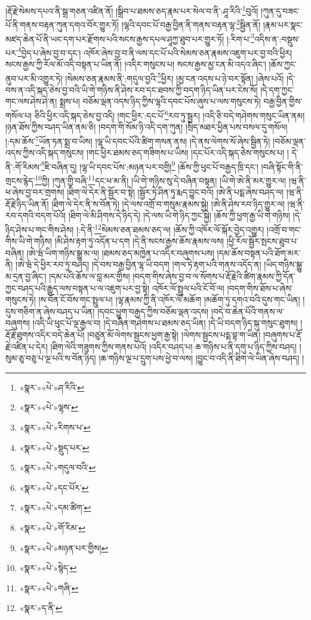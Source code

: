 །རྡོ་རྗེ་སེམས་དཔའ་ནི་སྒྲ་གཅན་འཛིན་ནོ། །སྒྲིབ་པ་ཐམས་ཅད་རྣམ་པར་སེལ་བ་ནི་:ཤཱ་རིའི་\footnote{«སྣར་»«པེ་»ཤ་རིའི་}བུའོ། །ཀུན་དུ་བཟང་པོ་ནི་གནས་བརྟན་ཀུན་དགའ་བོར་གྱུར་ཏོ། །ལྷའི་དབང་པོ་བརྒྱ་བྱིན་ནི་གནས་བརྟན་ལྷ་\footnote{«སྣར་»«པེ་»ལྷས་}སྦྱིན་ནོ། །རྣམ་པར་སྣང་མཛད་ཆེན་པོ་ནི་ཡང་དག་པར་རྫོགས་པའི་སངས་རྒྱས་དཔལ་ཤཱཀྱ་ཐུབ་པར་གྱུར་ཏོ། །:རིག་པ་\footnote{«སྣར་»«པེ་»རིགས་པ་}འདིས་ན་:བསྡུས་པར་\footnote{«སྣར་»«པེ་»སྡུད་པར་}བྱེད་པ་ཞེས་བྱ་བ་དང་། འཁོར་ཞེས་བྱ་བ་ནི་ལས་དང་པོ་པའི་སེམས་ཅན་རྣམས་འཇུག་པར་བྱ་བའི་ཕྱིར། སངས་རྒྱས་ཀྱི་རོལ་མོ་འདི་བསྟན་པ་ཡིན་ནོ། །འདིར་གསུངས་པ། སངས་རྒྱས་མྱ་ངན་མི་འདའ་ཞིང་། །ཆོས་ཀྱང་ནུབ་པར་མི་འགྱུར་ཏེ། །སེམས་ཅན་རྣམས་ནི་:གདུལ་བྱའི་\footnote{«སྣར་»«པེ་»གདུལ་བའི་}ཕྱིར། །མྱ་ངན་འདས་པ་ཉེ་བར་སྟོན། །ཞེས་པའོ། །དེ་བས་ན་འདི་སྐད་ཅེས་བྱ་བའི་ཡི་གེ་གཉིས་ནི་ཤེས་རབ་དང་ཐབས་ཀྱི་བདག་ཉིད་ཡིན་པར་ངེས་སོ། །དེ་དག་ཀྱང་གང་ལས་ཤེས་ཤེ་ན། སྨྲས་པ། བཅོམ་ལྡན་འདས་ཉིད་ཀྱིས་ལྷའི་དབང་པོས་ཞུས་པ་ལས་གསུངས་ཏེ། བརྒྱ་བྱིན་གྱིས་གསོལ་པ། ཅིའི་ཕྱིར་འདི་སྐད་ཅེས་བྱ་འདི། །གང་ཕྱིར་:དང་པོ་\footnote{«སྣར་»«པེ་»དང་པོར་}རབ་ཏུ་སྦྱར། །འདི་ཅི་བདེ་གཤེགས་གསུང་ཡིན་ནམ། །ཉན་ཐོས་ཀྱིས་བཤད་ཡིན་ནམ་ཅི། །བདག་གི་སོམ་ཉི་འདི་དག་ཀུན། །སྲིད་མཐར་ཕྱིན་པས་བསལ་དུ་གསོལ། །:དམ་ཆོས་\footnote{«སྣར་»«པེ་»དམ་ཚིག་}ཡོན་ཏན་སྨྲ་བ་ཡིས། །ལྷ་ཡི་དབང་པོའི་ཚིག་གསན་ནས། །དེ་ནས་ལེགས་སོ་ཞེས་སྦྱིན་ཏེ། །བཅོམ་ལྡན་འདས་ཀྱིས་འདི་སྐད་གསུངས། །གང་ཕྱིར་ཐམས་ཅད་གཟིགས་པ་ཡིས། །དང་པོར་འདི་སྐད་ཅེས་གསུངས་པ། །
དེ་ནི་:གོ་རིམས་\footnote{«སྣར་»«པེ་»གོ་རིམ་}ཇི་བཞིན་དུ། །ལྷ་ཡི་དབང་པོས་:མཉན་པར་བགྱི།\footnote{«སྣར་»«པེ་»མཉན་པར་གྱིས།} །ཆོས་ཀྱི་ཕུང་པོ་བརྒྱད་ཁྲི་དང་། །བཞི་སྟོང་གི་ནི་གྲངས་རྙེད་\footnote{«སྣར་»«པེ་»སྙེད་}ཀྱི། །ཀུན་གྱི་བཞི་\footnote{«སྣར་»«པེ་»གཞི་}དང་ཕ་མ་ནི། །ཡི་གེ་གཉིས་སུ་དེ་བཞིན་བསྟན། །ཡི་གེ་ཨེ་ནི་མར་གྱུར་ལ། །ཝ་ནི་ཕ་ཞེས་བྱ་བར་གྲགས། །ཐིག་ལེ་དེར་ནི་སྦྱོར་བ་སྟེ། །སྦྱོར་ཏེ་ཤིན་ཏུ་རྨད་བྱུང་བའོ། །ཨེ་ནི་པདྨ་ཞེས་བཤད་ལ། །ཝ་ནི་རྡོ་རྗེ་ཉིད་ཡིན་ནོ། །ཐིག་ལེ་དེར་ནི་ས་བོན་ཏེ། །དེ་ལས་འགྲོ་བ་གསུམ་རྣམས་སྐྱེ། །ཨེ་ནི་ཤེས་རབ་ཉིད་གྱུར་ལ། །ཝ་ནི་རབ་དགའི་བདག་པོའོ། །ཐིག་ལེ་མི་ཤིགས་དེ་ཉིད་དེ། །དེ་ལས་ཡི་གེ་ཉིད་ཀྱང་སྐྱེ། །ཆོས་ཀྱི་ཕྱག་རྒྱ་ཡི་གེ་གཉིས། །དེ་ཉིད་ཤེས་པ་གང་གིས་ཤེས། །:དེ་ནི་\footnote{«སྣར་»ད་ནི་}སེམས་ཅན་ཐམས་ཅད་ལ། །ཆོས་ཀྱི་འཁོར་ལོ་སྐོར་བྱེད་འགྱུར། །འགྲོ་བ་གང་གིས་ཡི་གེ་གཉིས། །མི་ཤེས་རྟག་ཏུ་འདོན་པ་དག །དེ་ནི་སངས་རྒྱས་ཆོས་རྣམས་ལས། །ཕྱི་རོལ་སྦྱོར་སྤངས་ཐུབ་པ་བཞིན། །ཨེ་ཝཾ་ཡིག་གཉིས་སྒྱུ་མ་ལ། །ཐམས་ཅད་མཁྱེན་པ་འདིར་བཞུགས་པས། །དམ་ཆོས་བསྟན་པའི་ཐོག་མར་ནི། །ཨེ་ཝཾ་དེ་ཕྱིར་རབ་ཏུ་བཤད། །དེ་བས་བརྒྱ་བྱིན་ལྷ་ཡི་བདག །གལ་ཏེ་རྟག་པའི་གནས་འདོད་ན། །ཡིད་གཉིས་སྒྱུ་མ་དྲན་བྱ་ཞིང་། །དམ་པའི་ཆོས་ལ་བླ་མར་གྱིས། །བདག་གིས་ཞེས་བྱ་བ་ལ་སོགས་པ་རྡོ་རྗེའི་ཚིག་རྣམས་ཀྱི་དོན་ཀྱང་བཤད་པའི་རྒྱུད་ལས་བསྟན་པ་ལ་འཇུག་པར་བྱ་སྟེ། འཁོར་ལོ་སྤྲུལ་པའི་ངོ་བོ་ལ། །བདག་གིས་ཐོས་པ་ཞེས་གསུངས་ཏེ། །ས་བོན་ངོ་བོས་གང་སྤྲུལ་པ། །ལྷ་རྣམས་ཀྱི་ནི་འཁོར་ལོ་མཆོག །མཆོག་ཏུ་དགའ་བའི་དུས་གང་ཡིན། །དུས་གཅིག་ན་ཞེས་བཤད་པ་ཡིན། །དབང་ཕྱུག་བརྒྱད་ཀྱིས་བཅོམ་ལྡན་འདས། །བདེ་བ་ཆེན་པོའི་གནས་ལ་བཞུགས། །འདི་ཡི་ཕུང་པོ་ལྔ་རྒྱལ་བ། །དེ་བཞིན་གཤེགས་པ་ཐམས་ཅད་ཡིན། །དེ་ཡི་བདག་ཉིད་སྐུ་གསུང་ཐུགས། །རྡོ་རྗེ་ཐུགས་འདིར་བདེ་ཆེན་པོ། །བཙུན་མོ་ལེགས་སྦྱངས་ཕྱག་རྒྱ་སྟེ། །ལེགས་སྦྱངས་པདྨ་བྷ་ག་ཡིན། །བཞུགས་པ་རྡོ་རྗེ་འཛིན་པ་དེར། །ཐིག་ལེའི་གཟུགས་ཀྱིས་གནས་པའོ། །འདིར་བཤད་པ། ཆ་གཉིས་པ་ནི་དགུ་པ་ཉིད་ཀྱིས་བཤད། །སུམ་ཅུ་བཅུ་པ་ལྔ་པའི་ས་བོན་ཉིད། །ཆ་གཉིས་ལྔ་པ་དྲུག་པས་ཕྱེ་བ་ལས། །བྱུང་བ་འདི་ནི་ཐིག་ལེ་ཡིན་ཞེས་བཤད། །
